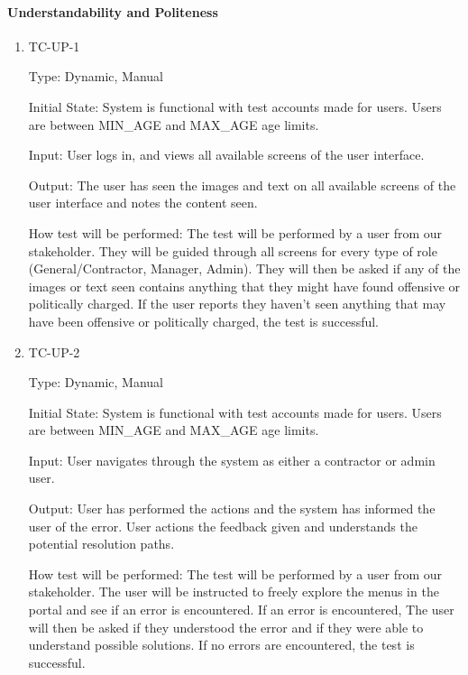 \documentclass[12pt, titlepage]{article}
\begin{document}
\paragraph{Understandability and Politeness}
\begin{enumerate}
  \item{TC-UP-1\\}

    Type: Dynamic, Manual

    Initial State: System is functional with test accounts made for users. Users
    are between MIN\_AGE and MAX\_AGE age limits.

    Input: User logs in, and views all available screens of the user interface.

    Output: The user has seen the images and text on all available screens of
    the user interface and notes the content seen.

    How test will be performed: The test will be performed by a user from our
    stakeholder. They will be guided through all screens for every type of role
    (General/Contractor, Manager, Admin). They will then be asked if any of the
    images or text seen contains anything that they might have found offensive
    or politically charged. If the user reports they haven't seen anything that
    may have been offensive or politically charged, the test is successful.

  \item{TC-UP-2\\}

    Type: Dynamic, Manual

    Initial State: System is functional with test accounts made for users. Users
    are between MIN\_AGE and MAX\_AGE age limits.

    Input: User navigates through the system as either a contractor or admin user.

    Output: User has performed the actions and the system has informed the user
    of the error. User actions the feedback given and understands the potential
    resolution paths.

    How test will be performed: The test will be performed by a user from our
    stakeholder. The user will be instructed to freely explore the menus in the portal and see if an error is encountered.
    If an error is encountered, The user will then be asked if they understood the error
    and if they were able to understand possible solutions.
    If no errors are encountered, the test is successful.

\end{enumerate}
\end{document}
